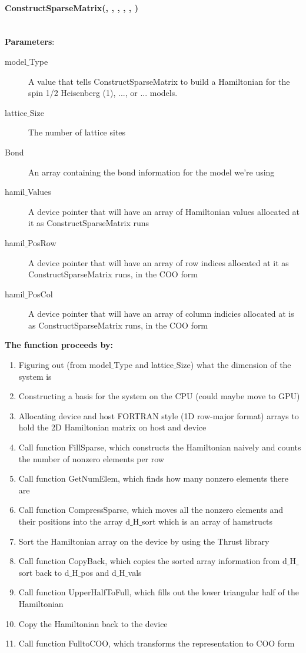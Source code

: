 \documentclass{article}
\begin{document}
\paragraph{\host \int ConstructSparseMatrix(\int, \int, \typelongptr, \cuDoubleComplex, \typelongptr, \typelongptr) \\ \\}
\noindent\textbf{Parameters}:
\begin{description}
\item[\int model$\_$Type] A value that tells ConstructSparseMatrix to build a Hamiltonian for the spin 1/2 Heisenberg (1), ..., or ... models.
\item[\int lattice$\_$Size] The number of lattice sites
\item[\typelongptr Bond] An array containing the bond information for the model we're using 
\item[\cuDoubleComplex hamil$\_$Values] A device pointer that will have an array of Hamiltonian values allocated at it as ConstructSparseMatrix runs
\item[\typelongptr hamil$\_$PosRow] A device pointer that will have an array of row indices allocated at it as ConstructSparseMatrix runs, in the COO form
\item[\typelongptr hamil$\_$PosCol] A device pointer that will have an array of column indicies allocated at is as ConstructSparseMatrix runs, in the COO form
\end{description}

\noindent\textbf{The function proceeds by:}
\begin{enumerate}
\item{Figuring out (from model$\_$Type and lattice$\_$Size) what the dimension of the system is}
\item{Constructing a basis for the system on the CPU (could maybe move to GPU)}
\item{Allocating device and host FORTRAN style (1D row-major format) arrays to hold the 2D Hamiltonian matrix on host and device}
\item{Call function FillSparse, which constructs the Hamiltonian naively and counts the number of nonzero elements per row}
\item{Call function GetNumElem, which finds how many nonzero elements there are}
\item{Call function CompressSparse, which moves all the nonzero elements and their positions into the array d$\_$H$\_$sort which is an array of hamstructs}
\item{Sort the Hamiltonian array on the device by using the Thrust library}
\item{Call function CopyBack, which copies the sorted array information from d$\_$H$\_$sort back to d$\_$H$\_$pos and d$\_$H$\_$vals}
\item{Call function UpperHalfToFull, which fills out the lower triangular half of the Hamiltonian}
\item{Copy the Hamiltonian back to the device}
\item{Call function FulltoCOO, which transforms the representation to COO form}
\end{enumerate}
\end{document}
